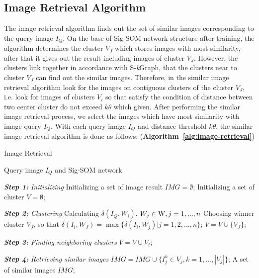 \documentclass{amcs}
\begin{document}
\subsection{Image Retrieval Algorithm}
The image retrieval algorithm finds out the set of similar images corresponding to the query image ${I_Q}$. On the base of Sig-SOM network structure after training, the algorithm determines the cluster ${V_J}$ which stores images with most similarity, after that it gives out the result including images of cluster ${V_J}$. However, the clusters link together in accordance with S-\textit{k}Graph, that the clusters near to cluster ${V_J}$ can find out the similar images. Therefore, in the similar image retrieval algorithm look for the images on contiguous clusters of the cluster ${V_J}$, i.e. look for images of clusters ${V_i}$ so that satisfy the condition of distance between two center cluster do not exceed $k\theta $ which given. After performing the similar image retrieval process, we select the images which have most similarity with image query ${I_Q}$. With each query image ${I_Q}$ and distance threshold $k\theta $, the similar image retrieval algorithm is done as follows: (\textbf{Algorithm~\ref{alg:image-retrieval}})
\begin{algorithm}[!ht]
\caption{Image Retrieval}
\label{alg:image-retrieval}
\begin{algorithmic}[1]
\REQUIRE Query image ${I_Q}$ and Sig-SOM network

\textit{\textbf{Step 1: }}\textit{Initializing }
\STATE Initializing a set of image result $IMG = \emptyset $;
\STATE Initializing a set of cluster $V = \emptyset $;

\textit{\textbf{Step 2: }}\textit{Clustering}
\STATE Calculating $\delta ({I_Q},{W_i})$, ${W_j} \in {\rm{W}}, j=1,...,n$
\STATE Choosing winner cluster ${V_J}$, so that $\delta ({I_i},{W_J}) = \max \{ \delta ({I_i},{W_j})|j = 1,2,...,n\} $;
\STATE $V = V \cup \{ {V_J}\}$;
	
\textit{\textbf{Step 3:}} \textit{Finding neighboring clusters}
\STATE $V = V \cup {V_i}$;
\ENDIF
\ENDFOR

\textbf{\textit{Step 4:}} \textit{Retrieving similar images}
\STATE $IMG = IMG \cup \{ I_j^k \in {V_j},k = 1,...,|{V_j}|\} $;
\ENDFOR
\RETURN A set of similar images $IMG$;
\end{algorithmic}
\end{algorithm}

\end{document}
